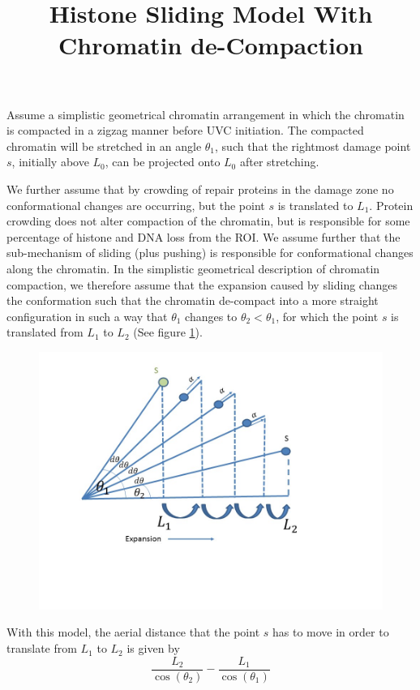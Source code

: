\documentclass[12pt]{report}
\begin{document}
\title{Histone Sliding Model With Chromatin de-Compaction}
\maketitle
 Assume a simplistic geometrical chromatin arrangement in which the chromatin is compacted in a zigzag manner before UVC initiation. The compacted chromatin will be stretched in an angle $\theta_1$, such that the rightmost damage point $s$, initially above $L_0$, can be projected onto $L_0$ after stretching. 
 
 We further assume that by crowding of repair proteins in the damage zone no conformational changes are occurring, but the point $s$ is translated to $L_1$. Protein crowding does not alter compaction of the chromatin, but is responsible for some percentage of histone and DNA loss from the ROI. 
 We assume further that the sub-mechanism of sliding (plus pushing) is responsible for conformational changes along the chromatin. In the simplistic geometrical description of chromatin compaction, we therefore assume that the expansion caused by sliding changes the conformation such that the chromatin de-compact into a more straight configuration in such a way that $\theta_1$ changes to $\theta_2<\theta_1$, for which the point $s$ is translated from $L_1$ to $L_2$ (See figure \ref{fig:slidingWithConformationalChanges}).

 
\begin{figure}[H]
\centering
\includegraphics[width=0.5\linewidth,height=0.4\textheight]{../Images/SlidingModel/slidingWithConformationalChanges}
\caption{}
\label{fig:slidingWithConformationalChanges}
\end{figure}

 With this model, the aerial distance that the point $s$ has to move in order to translate from $L_1$ to $L_2$ is given by 
 \begin{equation*}
 \frac{L_2}{\cos(\theta_2)}-\frac{L_1}{\cos(\theta_1)}
 \end{equation*}
 
\end{document}
